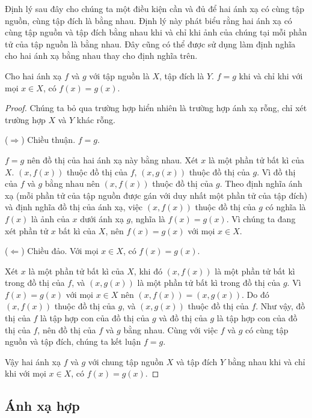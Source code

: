Định lý sau đây cho chúng ta một điều kiện cần và đủ để hai ánh xạ có cùng tập nguồn, cùng tập đích là bằng nhau. Định lý này phát biểu rằng hai ánh xạ có cùng tập nguồn và tập đích bằng nhau khi và chỉ khi ảnh của chúng tại mỗi phần tử của tập nguồn là bằng nhau. Đây cũng có thể được sử dụng làm định nghĩa cho hai ánh xạ bằng nhau thay cho định nghĩa trên.

\begin{theorem}\label{theorem:identical-mappings}
    Cho hai ánh xạ $f$ và $g$ với tập nguồn là $X$, tập đích là $Y$. $f = g$ khi và chỉ khi với mọi $x\in X$, có $f(x) = g(x)$.
\end{theorem}

\begin{proof}
    Chúng ta bỏ qua trường hợp hiển nhiên là trường hợp ánh xạ rỗng, chỉ xét trường hợp $X$ và $Y$ khác rỗng.

    ($\Rightarrow$) Chiều thuận. $f = g$.

    $f = g$ nên đồ thị của hai ánh xạ này bằng nhau. Xét $x$ là một phần tử bất kì của $X$. $(x, f(x))$ thuộc đồ thị của $f$, $(x, g(x))$ thuộc đồ thị của $g$. Vì đồ thị của $f$ và $g$ bằng nhau nên $(x, f(x))$ thuộc đồ thị của $g$. Theo định nghĩa ánh xạ (mỗi phần tử của tập nguồn được gán với duy nhất một phần tử của tập đích) và định nghĩa đồ thị của ánh xạ, việc $(x, f(x))$ thuộc đồ thị của $g$ có nghĩa là $f(x)$ là ảnh của $x$ dưới ánh xạ $g$, nghĩa là $f(x) = g(x)$. Vì chúng ta đang xét phần tử $x$ bất kì của $X$, nên $f(x) = g(x)$ với mọi $x\in X$.

    ($\Leftarrow$) Chiều đảo. Với mọi $x\in X$, có $f(x) = g(x)$.

    Xét $x$ là một phần tử bất kì của $X$, khi đó $(x, f(x))$ là một phần tử bất kì trong đồ thị của $f$, và $(x, g(x))$ là một phần tử bất kì trong đồ thị của $g$. Vì $f(x) = g(x)$ với mọi $x\in X$ nên $(x, f(x)) = (x, g(x))$. Do đó $(x, f(x))$ thuộc đồ thị của $g$, và $(x, g(x))$ thuộc đồ thị của $f$. Như vậy, đồ thị của $f$ là tập hợp con của đồ thị của $g$ và đồ thị của $g$ là tập hợp con của đồ thị của $f$, nên đồ thị của $f$ và $g$ bằng nhau. Cùng với việc $f$ và $g$ có cùng tập nguồn và tập đích, chúng ta kết luận $f = g$.

    Vậy hai ánh xạ $f$ và $g$ với chung tập nguồn $X$ và tập đích $Y$ bằng nhau khi và chỉ khi với mọi $x\in X$, có $f(x) = g(x)$.
\end{proof}

\subsection{Ánh xạ hợp}


